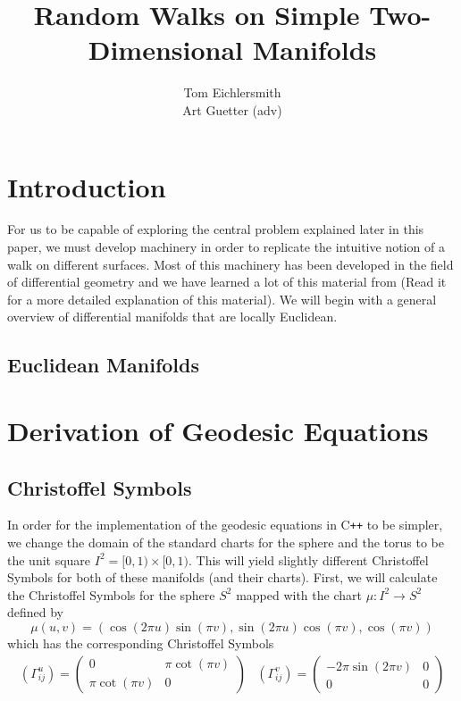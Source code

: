 \documentclass{article}
\title{Random Walks on Simple Two-Dimensional Manifolds}
\author{Tom Eichlersmith \\ Art Guetter (adv)}
\begin{document}
\section{Introduction}
	For us to be capable of exploring the central problem explained later in this paper, we must develop machinery in order to replicate the intuitive notion of a walk on different surfaces.
	Most of this machinery has been developed in the field of differential geometry and we have learned a lot of this material from \cite{BanchoffLovett_DiffGeo_2010} (Read it for a more detailed explanation of this material).
	We will begin with a general overview of differential manifolds that are locally Euclidean.
	
	\subsection{Euclidean Manifolds}
		

\section{Derivation of Geodesic Equations}
	
	\subsection{Christoffel Symbols}
		In order for the implementation of the geodesic equations in C\texttt{++} to be simpler, we change the domain of the standard charts for the sphere and the torus to be the unit square $I^2 = [0,1) \times [0,1)$.
		This will yield slightly different Christoffel Symbols for both of these manifolds (and their charts).
		First, we will calculate the Christoffel Symbols for the sphere $S^2$ mapped with the chart $\mu:I^2 \to S^2$ defined by
		$$ \mu(u,v) = (\cos(2\pi u)\sin(\pi v), \sin(2\pi u)\cos(\pi v), \cos(\pi v)) $$
		which has the corresponding Christoffel Symbols
		\begin{equation}
			\begin{array}{lr}
			\left(\Gamma^{u}_{ij}\right) = \left( \begin{array}{cc}
					0 & \pi\cot(\pi v) \\
					\pi\cot(\pi v) & 0
				\end{array} \right) &
			\left(\Gamma^{v}_{ij}\right) = \left( \begin{array}{cc}
					-2\pi\sin(2\pi v) & 0 \\
					0 & 0
				\end{array} \right)
			\end{array}
		\end{equation}
	
\end{document}

